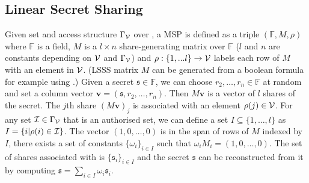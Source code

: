 \subsection{Linear Secret Sharing}
Given set \ServerSet and access structure $\Gamma_\mathcal{V}$ over \ServerSet, a \ac{MSP} is defined as a triple $(\mathbb{F},M,\rho)$ where $\mathbb{F}$ is a field, $M$ is a $l\times n$ share-generating matrix over $\mathbb{F}$ ($l$ and $n$ are constants depending on  $\mathcal{V}$ and $\Gamma_\mathcal{V}$) and $\rho:\{1,...l\}\rightarrow \mathcal{V}$ labels each row of $M$ with an element in $\mathcal{V}$. 
(\ac{LSSS} matrix $M$ can be generated from a boolean formula for example using \citet[Algorithm 1]{LiuC10}.)
Given a secret $\mathfrak{s}\in \mathbb{F}$, we can choose $r_2,\ldots,r_n \in \mathbb{F}$ at random and set a column vector $\mathbf{v}=(\mathfrak{s},r_2,\ldots,r_n)$. 
Then $M\mathbf{v}$ is a vector of $l$ shares of the secret. 
The $j$th share $(M\mathbf{v})_{j}$ is associated with an element $\rho(j) \in \mathcal{V}$. 
For any set $\mathcal{I}\in \Gamma_\mathcal{V}$ that is an authorised set, we can define a set $I\subseteq \{1,\ldots,l\}$ as $I=\{i|\rho(i)\in \mathcal{I}\}$. 
The vector $(1,0,\ldots,0)$ is in the span of rows of $M$ indexed by $I$, \ie there exists a set of constants $\{\omega_i\}_{i\in I}$ such that $\omega_iM_i=(1,0,\ldots,0)$. 
The set of shares associated with \ClientSet is $\{\mathfrak{s}_i\}_{i\in I}$ and the secret $\mathfrak{s}$ can be reconstructed from it by computing $\mathfrak{s}=\sum_{i\in I}\omega_i\mathfrak{s}_i$.

